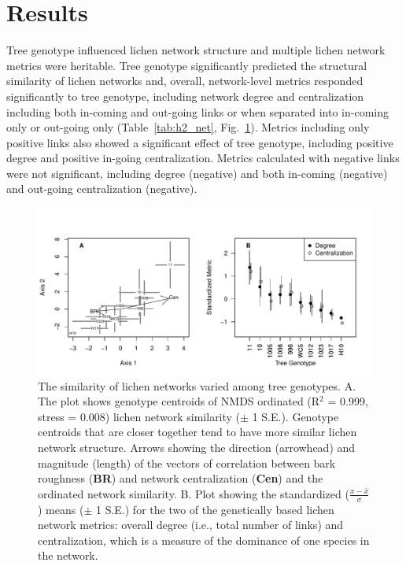 \documentclass[fleqn,12pt]{olplainarticle}
\begin{document}
\section*{Results}

Tree genotype influenced lichen network structure and multiple lichen
network metrics were heritable.  Tree genotype significantly predicted
the structural similarity of lichen networks and, overall,
network-level metrics responded significantly to tree genotype,
including network degree and centralization including both in-coming
and out-going links or when separated into in-coming only or out-going
only (Table~\ref{tab:h2_net}, Fig.~\ref{fig:h2_plot}).  Metrics
including only positive links also showed a significant effect of tree
genotype, including positive degree and positive in-going
centralization.  Metrics calculated with negative links were not
significant, including degree (negative) and both in-coming (negative)
and out-going centralization (negative).

\begin{figure}[ht]
\centering
\includegraphics[width=\linewidth]{figures/h2_plot.pdf}
\caption{The similarity of lichen networks varied among tree
  genotypes. A. The plot shows genotype centroids of NMDS ordinated
  (R$^2$ = 0.999, stress = 0.008) lichen network similarity ($\pm$ 1
  S.E.). Genotype centroids that are closer together tend to have more
  similar lichen network structure. Arrows showing the direction
  (arrowhead) and magnitude (length) of the vectors of correlation
  between bark roughness (\textbf{BR}) and network centralization
  (\textbf{Cen}) and the ordinated network similarity. B. Plot showing
  the standardized ($\frac{x - \bar{x}}{\sigma}$) means ($\pm$ 1 S.E.)
  for the two of the genetically based lichen network metrics: overall
  degree (i.e., total number of links) and centralization, which is a
  measure of the dominance of one species in the network.}
\label{fig:h2_plot}
\end{figure}
\end{document}

